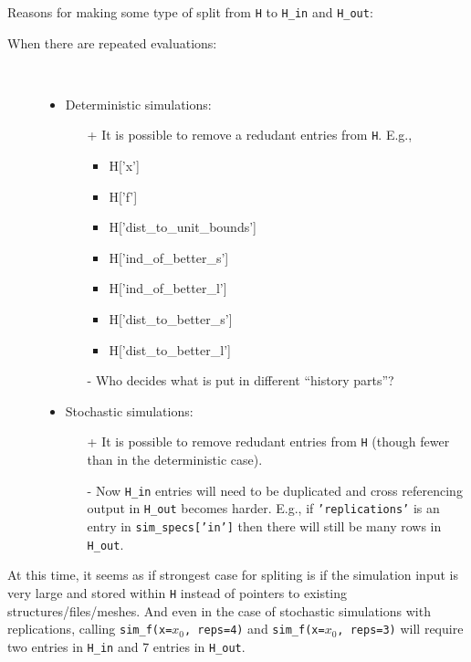 \documentclass{article}
\newenvironment{allintypewriter}{\ttfamily}{\par}
\begin{document}
Reasons for making some type of split from \texttt{H} to \texttt{H\_in} and \texttt{H\_out}:
\begin{description}
  \item[When there are repeated evaluations:]\
    \begin{itemize}
      \item Deterministic simulations:
        \begin{itemize}
          \item[+] It is possible to remove a redudant entries from \texttt{H}. E.g.,
            \begin{allintypewriter}
              \begin{itemize}
                \item H['x']
                \item H['f']
                \item H['dist\_to\_unit\_bounds']
                \item H['ind\_of\_better\_s']
                \item H['ind\_of\_better\_l']
                \item H['dist\_to\_better\_s']
                \item H['dist\_to\_better\_l']
              \end{itemize}
            \end{allintypewriter}
          \item[-] Who decides what is put in different ``history parts''?
        \end{itemize}
      \item Stochastic simulations:
        \begin{itemize}
          \item[+] It is possible to remove redudant entries from \texttt{H}
            (though fewer than in the deterministic case).
          \item[-] Now \texttt{H\_in} entries will need to be duplicated and
            cross referencing output in \texttt{H\_out} becomes harder. E.g.,
            if \texttt{'replications'} is an entry in \texttt{sim\_specs['in']}
            then there will still be many rows in \texttt{H\_out}.
        \end{itemize}
    \end{itemize}
\end{description}

At this time, it seems as if strongest case for spliting is if the simulation
input is very large and stored within \texttt{H} instead of pointers to
existing structures/files/meshes. And even in the case of stochastic
simulations with replications, calling \texttt{sim\_f(x=$x_0$, reps=4)} and
\texttt{sim\_f(x=$x_0$, reps=3)} will require two entries in \texttt{H\_in} and
7 entries in \texttt{H\_out}.
\end{document}
